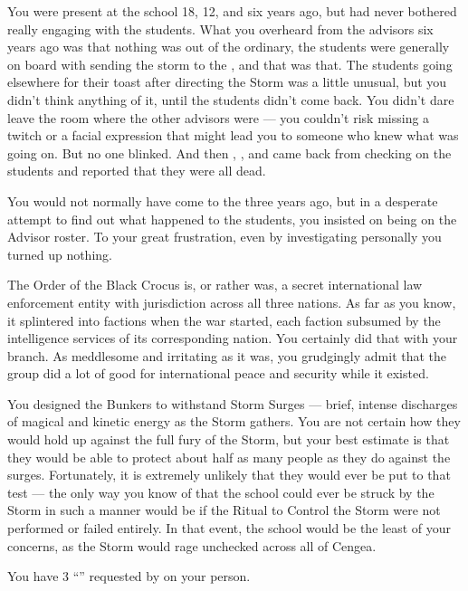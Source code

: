 \documentclass[char]{GL2020}
\begin{document}
\begin{itemz}[Notes]
    \item You were present at the school 18, 12, and six years ago, but had never bothered really engaging with the students. What you overheard from the advisors six years ago was that nothing was out of the ordinary, the students were generally on board with sending the storm to the \pTech{}, and that was that. The students going elsewhere for their toast after directing the Storm was a little unusual, but you didn't think anything of it, until the students didn't come back. You didn't dare leave the room where the other advisors were — you couldn't risk missing a twitch or a facial expression that might lead you to someone who knew what was going on. But no one blinked. And then \cPrincipal{}, \cDiplomat{\intro}, and \cMusic{\intro} came back from checking on the students and reported that they were all dead.
    \item You would not normally have come to the \pSc{} three years ago, but in a desperate attempt to find out what happened to the students, you insisted on being on the Advisor roster. To your great frustration, even by investigating personally you turned up nothing.
    \item The Order of the Black Crocus is, or rather was, a secret international law enforcement entity with jurisdiction across all three nations. As far as you know, it splintered into factions when the war started, each faction subsumed by the intelligence services of its corresponding nation. You certainly did that with your branch. As meddlesome and irritating as it was, you grudgingly admit that the group did a lot of good for international peace and security while it existed.
    \item You designed the Bunkers to withstand Storm Surges — brief, intense discharges of magical and kinetic energy as the Storm gathers. You are not certain how they would hold up against the full fury of the Storm, but your best estimate is that they would be able to protect about half as many people as they do against the surges. Fortunately, it is extremely unlikely that they would ever be put to that test — the only way you know of that the school could ever be struck by the Storm in such a manner would be if the Ritual to Control the Storm were not performed or failed entirely. In that event, the school would be the least of your concerns, as the Storm would rage unchecked across all of Cengea.
    \item You have 3 ``\iMagitechParts{}'' requested by \cTechStar{} on your person. 
\end{itemz}
\end{document}
